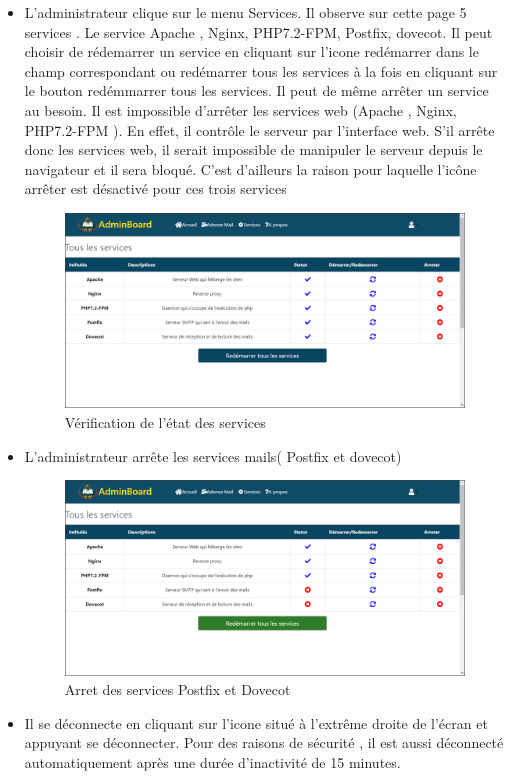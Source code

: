 \documentclass[a4paper,12pt,french]{report} %
\begin{document}
\begin{itemize}
\item L'administrateur clique sur le menu Services. Il observe sur cette page 5 services . Le service Apache , Nginx, PHP7.2-FPM, Postfix, dovecot. Il peut choisir de rédemarrer un service en cliquant sur l'icone redémarrer dans le champ correspondant ou redémarrer tous les services à la fois en cliquant sur le bouton redémmarrer tous les services. Il peut de même arrêter un service au besoin. Il est impossible d'arrêter les services web (Apache , Nginx, PHP7.2-FPM ). En effet, il contrôle le serveur par l'interface web. S'il arrête donc les services web, il serait impossible de manipuler le serveur depuis le navigateur et il sera bloqué. C'est d'ailleurs la raison pour laquelle l'icône arrêter est désactivé pour ces trois services 
\begin{figure}[H]
\centering
\includegraphics[scale=0.5]{figure/admin_verify_state_of_service.png}
\caption{Vérification de l'état des services}
\end{figure}  

\item L'administrateur arrête les services mails( Postfix et dovecot)
\begin{figure}[H]
\centering
\includegraphics[scale=0.5]{figure/admin_stop_service_mail.png}
\caption{Arret des services Postfix et Dovecot}
\end{figure}  

\item Il se déconnecte en cliquant sur l'icone situé à l'extrême droite de l'écran et appuyant se déconnecter. Pour des raisons de sécurité , il est aussi déconnecté automatiquement après une durée d'inactivité de 15 minutes. 

\end{itemize}
\end{document}
